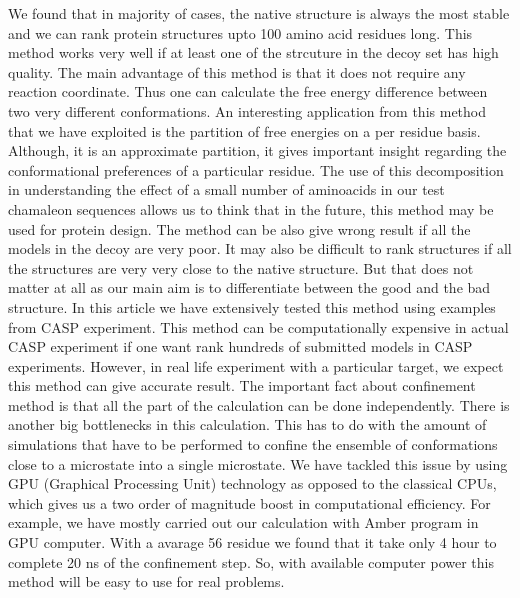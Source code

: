 \documentclass[12pt]{article}
\begin{document}
We found that in majority of cases, the native structure is always the most stable and we can rank
protein structures upto 100 amino 
acid residues long. This method works very well if at least one of the strcuture in the decoy set
has high quality. The main advantage of this method is 
that it does not require any reaction coordinate. Thus one can calculate the free energy difference between two very different conformations. 
An interesting application from this method that we have exploited is the partition of free energies
on a per residue basis.
 Although, it is an approximate partition, it gives important insight regarding the conformational 
preferences of a particular residue. The use of this decomposition in understanding the effect of a
small number of aminoacids in our test chamaleon sequences allows us to think that in the future,
this method may be used for protein design. 
The method can be also give wrong result if all the models in the decoy are very poor. It may also be difficult to rank structures if 
all the structures are very very close to the native structure. But that does not matter at all as our main aim is to differentiate
between the good and the bad structure. In this article we have extensively tested this method using examples from CASP experiment.
This method can be computationally expensive in actual CASP experiment if one want rank hundreds of submitted models in CASP 
experiments. However, in real life experiment with a particular target, we expect this method can give accurate result. The important 
fact about confinement method is that all the part of the calculation can be done independently. 
There is another big bottlenecks in this calculation. This has to do with the amount of
simulations that have to be performed to confine the ensemble of conformations close to a microstate
into a single microstate. We have tackled this issue by using GPU (Graphical Processing Unit) technology as opposed to the classical
CPUs, which gives us a two order of magnitude boost in computational efficiency.
For example, we have mostly carried out our calculation with Amber program \cite{Case2005} in GPU computer. With a avarage 56 residue 
we found that it take only 4 hour to complete 20 ns of the confinement step. So, with available computer power this method will 
be easy to use for real problems. 
 
\end{document}
